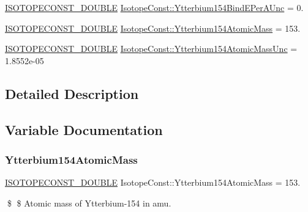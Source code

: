 \begin{DoxyCompactItemize}
\mbox{\hyperlink{group___isotope_const-_macros_ga8f45a7272ce02c0b4c65c44636ed719a}{I\+S\+O\+T\+O\+P\+E\+C\+O\+N\+S\+T\+\_\+\+D\+O\+U\+B\+LE}} \mbox{\hyperlink{group___isotope_const-_ytterbium-_yb154_gae6658d468b848abd4ff643441b5643b3}{Isotope\+Const\+::\+Ytterbium154\+Bind\+E\+Per\+A\+Unc}} = 0.
\item 
\mbox{\hyperlink{group___isotope_const-_macros_ga8f45a7272ce02c0b4c65c44636ed719a}{I\+S\+O\+T\+O\+P\+E\+C\+O\+N\+S\+T\+\_\+\+D\+O\+U\+B\+LE}} \mbox{\hyperlink{group___isotope_const-_ytterbium-_yb154_ga8597cc6a4d4585ef82e095c61cedd073}{Isotope\+Const\+::\+Ytterbium154\+Atomic\+Mass}} = 153.
\item 
\mbox{\hyperlink{group___isotope_const-_macros_ga8f45a7272ce02c0b4c65c44636ed719a}{I\+S\+O\+T\+O\+P\+E\+C\+O\+N\+S\+T\+\_\+\+D\+O\+U\+B\+LE}} \mbox{\hyperlink{group___isotope_const-_ytterbium-_yb154_ga83b164dfbbef9ee32ab07eb84717c6d2}{Isotope\+Const\+::\+Ytterbium154\+Atomic\+Mass\+Unc}} = 1.\+8552e-\/05
\end{DoxyCompactItemize}


\subsection{Detailed Description}


\subsection{Variable Documentation}
\mbox{\label{group___isotope_const-_ytterbium-_yb154_ga8597cc6a4d4585ef82e095c61cedd073}} 
\subsubsection{\texorpdfstring{Ytterbium154\+Atomic\+Mass}{Ytterbium154AtomicMass}}
{\footnotesize\ttfamily \mbox{\hyperlink{group___isotope_const-_macros_ga8f45a7272ce02c0b4c65c44636ed719a}{I\+S\+O\+T\+O\+P\+E\+C\+O\+N\+S\+T\+\_\+\+D\+O\+U\+B\+LE}} Isotope\+Const\+::\+Ytterbium154\+Atomic\+Mass = 153.}

\$ \$ Atomic mass of Ytterbium-\/154 in amu. \mbox{\label{group___isotope_const-_ytterbium-_yb154_ga83b164dfbbef9ee32ab07eb84717c6d2}} 

